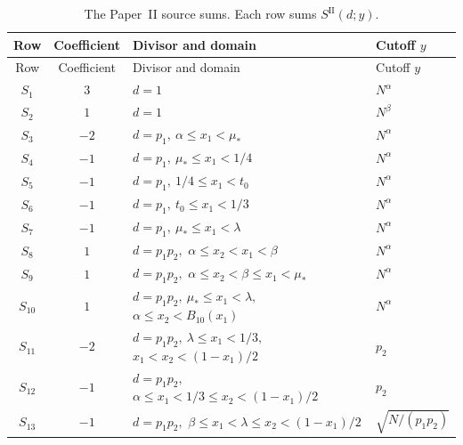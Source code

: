 \begin{longtable}{@{}c c p{} p{}@{}}
\caption{The Paper~II source sums. Each row sums \(S^{\mathrm{II}}(d;y)\).}
\label{tab:source-paperii-rows}\\
\hline
Row & Coefficient & Divisor and domain & Cutoff \(y\)\\
\hline
\endfirsthead
\hline
Row & Coefficient & Divisor and domain & Cutoff \(y\)\\
\hline
\endhead
\(S_1\)&\(3\)&\(d=1\)&\(N^\alpha\)\\
\(S_2\)&\(1\)&\(d=1\)&\(N^\beta\)\\
\(S_3\)&\(-2\)&\(d=p_1,\ \alpha\le x_1<\mu_*\)&\(N^\alpha\)\\
\(S_4\)&\(-1\)&\(d=p_1,\ \mu_*\le x_1<1/4\)&\(N^\alpha\)\\
\(S_5\)&\(-1\)&\(d=p_1,\ 1/4\le x_1<t_0\)&\(N^\alpha\)\\
\(S_6\)&\(-1\)&\(d=p_1,\ t_0\le x_1<1/3\)&\(N^\alpha\)\\
\(S_7\)&\(-1\)&\(d=p_1,\ \mu_*\le x_1<\lambda\)&\(N^\alpha\)\\
\(S_8\)&\(1\)&\(d=p_1p_2,\)\newline
 \(\alpha\le x_2<x_1<\beta\)&\(N^\alpha\)\\
\(S_9\)&\(1\)&\(d=p_1p_2,\)\newline
 \(\alpha\le x_2<\beta\le x_1<\mu_*\)&\(N^\alpha\)\\
\(S_{10}\)&\(1\)&\(d=p_1p_2,\ \mu_*\le x_1<\lambda,\)\newline
 \(\alpha\le x_2<B_{10}(x_1)\)&\(N^\alpha\)\\
\(S_{11}\)&\(-2\)&\(d=p_1p_2,\ \lambda\le x_1<1/3,\)\newline
 \(x_1<x_2<(1-x_1)/2\)&\(p_2\)\\
\(S_{12}\)&\(-1\)&\(d=p_1p_2,\)\newline
 \(\alpha\le x_1<1/3\le x_2<(1-x_1)/2\)&\(p_2\)\\
\(S_{13}\)&\(-1\)&\(d=p_1p_2,\)\newline
 \(\beta\le x_1<\lambda\le x_2<(1-x_1)/2\)&
 \(\sqrt{N/(p_1p_2)}\)\\
\hline
\end{longtable}

